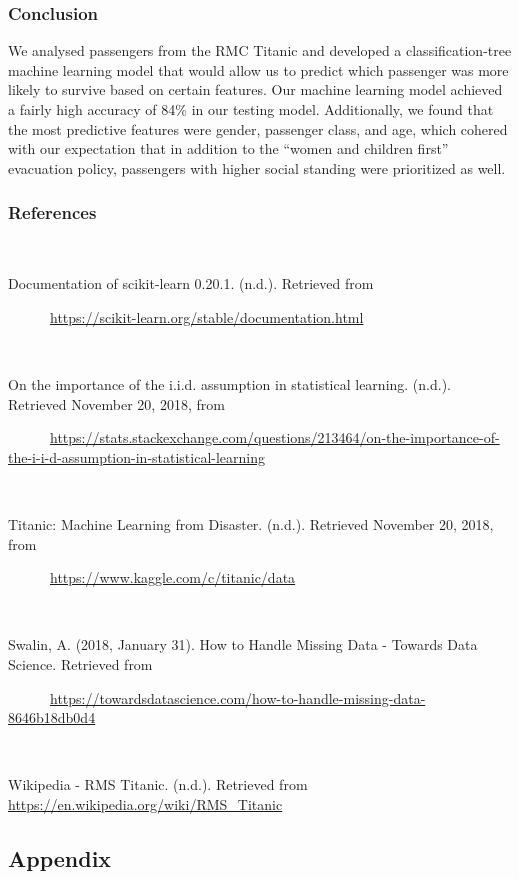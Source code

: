\documentclass[]{article}
\begin{document}
\subsubsection{Conclusion}\label{conclusion}

We analysed passengers from the RMC Titanic and developed a
classification-tree machine learning model that would allow us to
predict which passenger was more likely to survive based on certain
features. Our machine learning model achieved a fairly high accuracy of
84\% in our testing model. Additionally, we found that the most
predictive features were gender, passenger class, and age, which cohered
with our expectation that in addition to the ``women and children
first'' evacuation policy, passengers with higher social standing were
prioritized as well.

\newpage

\subsubsection{References}\label{references}

~

Documentation of scikit-learn 0.20.1. (n.d.). Retrieved from

~~~~~~\url{https://scikit-learn.org/stable/documentation.html}

~

On the importance of the i.i.d. assumption in statistical learning.
(n.d.). Retrieved November 20, 2018, from

~~~~~~\url{https://stats.stackexchange.com/questions/213464/on-the-importance-of-the-i-i-d-assumption-in-statistical-learning}

~

Titanic: Machine Learning from Disaster. (n.d.). Retrieved November 20,
2018, from

~~~~~~\url{https://www.kaggle.com/c/titanic/data}

~

Swalin, A. (2018, January 31). How to Handle Missing Data - Towards Data
Science. Retrieved from

~~~~~~\url{https://towardsdatascience.com/how-to-handle-missing-data-8646b18db0d4}

~

Wikipedia - RMS Titanic. (n.d.). Retrieved from
\url{https://en.wikipedia.org/wiki/RMS_Titanic}

\newpage

\subsection{Appendix}\label{appendix}
\end{document}
